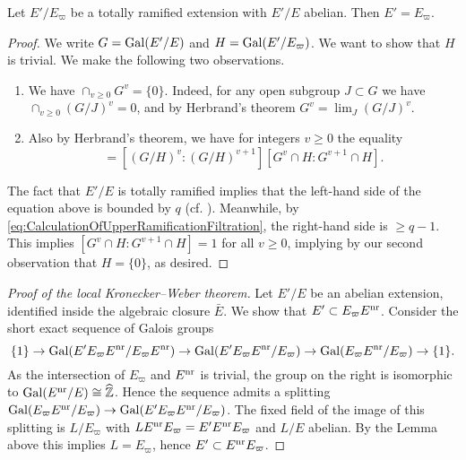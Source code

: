 \documentclass[../main.tex]{subfiles}
\begin{document}
\begin{lem}\label{lem:LocalKronWebAlmostDone}
  Let $E'/E_\varpi$ be a totally ramified extension with $E'/E$ abelian.
  Then $E' = E_\varpi$. 
\begin{proof}
  We write $G = \operatorname{Gal}(E'/E)$ and $H = \operatorname{Gal}(E'/E_\varpi)$. We want to show that 
  $H$ is trivial. We make the following two observations.
  \begin{enumerate}
    \item We have $\cap_{v \geq 0} G^v = \{0\}$. Indeed, for any open subgroup
      $J \subset G$ we have $\cap_{v \geq 0} (G/J)^v = 0$, and by Herbrand's theorem
      $G^v = \lim_J (G/J)^v$. 
    \item Also by Herbrand's theorem, we have for integers $v \geq 0$ the equality
      \begin{equation*}
        [G^v : G^{v+1}] = [(G/H)^v : (G/H)^{v+1}] [G^v \cap H : G^{v+1} \cap H].
      \end{equation*}
  \end{enumerate}
  The fact that $E'/E$ is totally ramified implies that the left-hand side of
  the equation above is bounded by $q$ (cf. \cite[Lemma 3]{gold1981local}).
  Meanwhile, by \eqref{eq:CalculationOfUpperRamificationFiltration}, the
  right-hand side is $\geq q-1$. This implies $[G^v \cap H : G^{v+1} \cap H] =
  1$ for all $v \geq 0$, implying by our second observation that $H = \{0\}$,
  as desired.
\end{proof}
\end{lem}

\begin{proof}[Proof of the local Kronecker--Weber theorem]
  Let $E'/E$ be an abelian extension, identified inside the 
  algebraic closure $\bar E$. We show that $E' \subset E_\varpi E^{\mathrm{nr}}$. 
  Consider the short exact sequence of Galois groups
  \begin{equation*}
    \{1\} \to \operatorname{Gal}(E' E_\varpi E^{\mathrm{nr}}/ E_\varpi E^{\mathrm{nr}}) \to 
    \operatorname{Gal}(E' E_\varpi E^{\mathrm{nr}}/ E_\varpi) \to 
    \operatorname{Gal}(E_\varpi E^{\mathrm{nr}}/ E_\varpi) \to  \{1\}.
  \end{equation*}
  As the intersection of  $E_\varpi$ and $E^{\mathrm{nr}}$ is trivial, the group on the right
  is isomorphic to $\operatorname{Gal}(E^{\mathrm{nr}} /E) \cong \widehat {\mathbb{Z}}$. Hence the sequence admits 
  a splitting $\operatorname{Gal}(E_\varpi E^{\mathrm{nr}}/ E_\varpi) \to \operatorname{Gal}(E' E_\varpi E^{\mathrm{nr}}/
  E_\varpi)$. The fixed field of the image of this splitting is 
  $L/E_\varpi$ with $L E^{\mathrm{nr}} E_\varpi = E' E^{\mathrm{nr}} E_\varpi$ and $L/E$ abelian.
  By the Lemma above this implies $L = E_\varpi$, hence $E' \subset E^{\mathrm{nr}} E_\varpi$. 
\end{proof}


\end{document}
